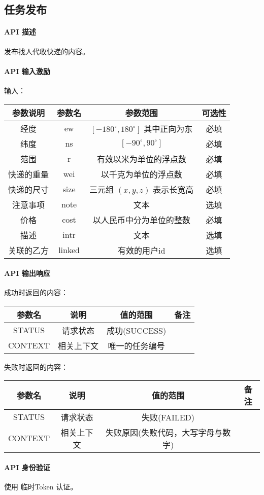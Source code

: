 \documentclass[UTF8]{dingo}
\def\apiintr{\paragraph{\colorbox[rgb]{1.0,0.6,0.65}{API 描述}}} %
\def\apiexc{\paragraph{\colorbox[rgb]{1,0.85,0.45}{API 输入激励}}} %
\def\apiresp{\paragraph{\colorbox[rgb]{0.9,0.9,1}{API 输出响应}}} %
\def\apiauth{\paragraph{\colorbox[rgb]{0.45,0.9,1}{API 身份验证}}} %
\def\失败{\colorbox[rgb]{1,0.5,0.5}{失败}}
\def\成功{\colorbox[rgb]{0.4,1,0.5}{成功}}
\def\成功V{成功(SUCCESS)}
\def\失败V{失败(FAILED)}
\def\失败原因{失败原因(失败代码，大写字母与数字)}
\begin{document}
    \subsection{任务发布}
    \apiintr
    发布找人代收快递的内容。
    \apiexc
    输入：\\
    \begin{tabular}{|c|c|c|c|}
        \hline \rule[-2ex]{0pt}{5.5ex} 参数说明 & 参数名 & 参数范围 & 可选性 \\
        \hline \rule[-2ex]{0pt}{5.5ex} 经度 & ew & $[-180^\circ,180^\circ]$ 其中正向为东 & 必填 \\
        \hline \rule[-2ex]{0pt}{5.5ex} 纬度 & ns & $[-90^\circ,90^\circ]$ & 必填 \\
        \hline \rule[-2ex]{0pt}{5.5ex} 范围 & r & 有效以米为单位的浮点数 & 必填 \\
        \hline \rule[-2ex]{0pt}{5.5ex} 快递的重量 & wei & 以千克为单位的浮点数 & 必填 \\
        \hline \rule[-2ex]{0pt}{5.5ex} 快递的尺寸 & size & 三元组 $(x,y,z)$ 表示长宽高 & 必填 \\
        \hline \rule[-2ex]{0pt}{5.5ex} 注意事项 & note & 文本 & 选填 \\
        \hline \rule[-2ex]{0pt}{5.5ex} 价格 & cost & 以人民币中分为单位的整数 & 必填 \\
        \hline \rule[-2ex]{0pt}{5.5ex} 描述 & intr & 文本 & 选填 \\
        \hline \rule[-2ex]{0pt}{5.5ex} 关联的乙方 & linked & 有效的用户id & 选填 \\
        \hline
    \end{tabular}
    \apiresp
    \成功 时返回的内容：\\
    \begin{tabular}{|c|c|c|c|}
        \hline \rule[-2ex]{0pt}{5.5ex} 参数名 & 说明 & 值的范围 & 备注 \\
        \hline \rule[-2ex]{0pt}{5.5ex} STATUS & 请求状态 & \成功V &  \\
        \hline \rule[-2ex]{0pt}{5.5ex} CONTEXT & 相关上下文 & 唯一的任务编号 &  \\
        \hline
    \end{tabular}
    \par \失败 时返回的内容：\\
    \begin{tabular}{|c|c|c|c|}
        \hline \rule[-2ex]{0pt}{5.5ex} 参数名 & 说明 & 值的范围 & 备注 \\
        \hline \rule[-2ex]{0pt}{5.5ex} STATUS & 请求状态 & \失败V &  \\
        \hline \rule[-2ex]{0pt}{5.5ex} CONTEXT & 相关上下文 & \失败原因 &  \\
        \hline
    \end{tabular}
    \apiauth
    使用 临时Token 认证。
\end{document}
